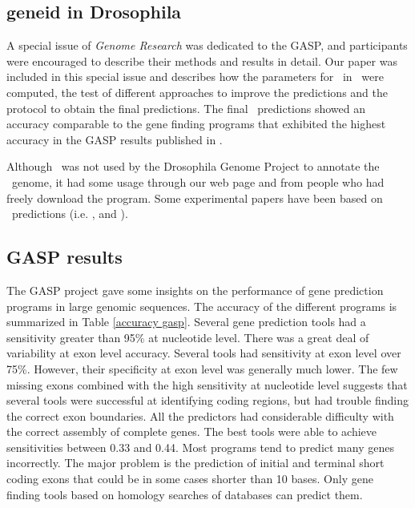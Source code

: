 \subsection{geneid in Drosophila}
\label{geneid paper}

A special issue of {\it Genome Research} was dedicated to the GASP,
and participants were encouraged to describe their methods and results
in detail. Our paper was included in this special issue and describes
how the parameters for \geneid\ in \Dm\ were computed, the test of
different approaches to improve the predictions and the protocol to
obtain the final predictions. The final \geneid\ predictions showed an
accuracy comparable to the gene finding programs that exhibited the
highest accuracy in the GASP results published in
\cite{reese:2000a}.

Although \geneid\ was not used by the Drosophila Genome Project to
annotate the \Dm\ genome, it had some usage through our web page and
from people who had freely download the program. Some experimental
papers have been based on \geneid\ predictions
(i.e. \cite{dunlop:2000a}, \cite{castellano:2001a} and \cite{beltran:2003a}).




\subsection{GASP results}

The GASP project gave some insights on the performance of gene
prediction programs in large genomic sequences. The accuracy of the
different programs is summarized in Table \ref{accuracy gasp}. Several
gene prediction tools had a sensitivity greater than 95\% at
nucleotide level. There was a great deal of variability at exon level
accuracy. Several tools had sensitivity at exon level over
75\%. However, their specificity at exon level was generally much
lower. The few missing exons combined with the high sensitivity at
nucleotide level suggests that several tools were successful at identifying
coding regions, but had trouble finding the correct exon boundaries.
All the predictors had considerable difficulty with the correct
assembly of complete genes. The best tools were able to achieve
sensitivities between 0.33 and 0.44. Most programs tend to predict
many genes incorrectly. The major problem is the prediction of initial
and terminal short coding exons that could be in some cases shorter
than 10 bases. Only gene finding tools based on homology searches of
databases can predict them.


